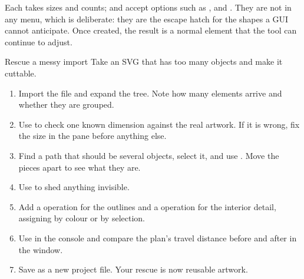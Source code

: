\noindent Each takes sizes and counts;  and  accept
options such as ,  and . They are not in
any menu, which is deliberate: they are the escape hatch for the shapes a GUI
cannot anticipate. Once created, the result is a normal element that the
 tool can continue to adjust.

\begin{tryit}{Rescue a messy import}
Take an SVG that has too many objects and make it cuttable.
\begin{enumerate}[label=\arabic*.,leftmargin=1.4em]
  \item Import the file and expand the tree. Note how many elements arrive and
        whether they are grouped.
  \item Use  to check one known dimension against the real artwork.
        If it is wrong, fix the size in the  pane before anything
        else.
  \item Find a path that should be several objects, select it, and use
        . Move the pieces apart to see what they are.
  \item Use  to shed anything invisible.
  \item Add a  operation for the outlines and a 
        operation for the interior detail, assigning by colour or by selection.
  \item Use  in the console and compare the plan's travel
        distance before and after in the  window.
  \item Save as a new project file. Your rescue is now reusable artwork.
\end{enumerate}
\end{tryit}
